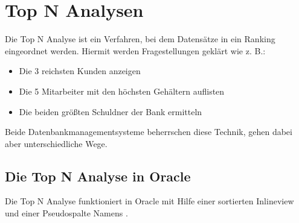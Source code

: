     \section{Top N Analysen}
      Die Top N Analyse ist ein Verfahren, bei dem Datens\"atze in ein Ranking eingeordnet werden. Hiermit werden Fragestellungen gekl\"art wie z. B.:
      \begin{itemize}
        \item Die 3 reichsten Kunden anzeigen
        \item Die 5 Mitarbeiter mit den h\"ochsten Geh\"altern auflisten
        \item Die beiden gr\"o\ss{}ten Schuldner der Bank ermitteln
      \end{itemize}
      Beide Datenbankmanagementsysteme beherrschen diese Technik, gehen dabei aber unterschiedliche Wege.
      \subsection{Die Top N Analyse in Oracle}
        Die Top N Analyse funktioniert in Oracle mit Hilfe einer sortierten Inlineview und einer Pseudospalte Namens .
